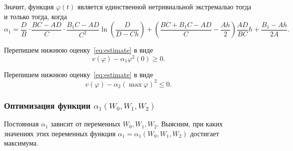 \documentclass[a4paper,14pt]{article}
\begin{document}
Значит, функция $\varphi(t)$ является единственной нетривиальной экстремалью
тогда и только тогда, когда
\begin{equation*}
  \alpha_1
  =
  \frac{D}{B} \cdot
  \frac{B C - A D}{C} \cdot
  \frac{B_1 C - A D}{C^2}
  \ln \left( \frac{D}{D - C h} \right)
  +
  \left( \frac{B C + B_1 C - A D}{C} - \frac{A h }{2} \right)
  \frac{AD}{BC} h
  +
  \frac{B_1 - A h}{2 A}.
\end{equation*}

Перепишем нижнюю оценку~\eqref{eq:estimate} в виде
\begin{equation*}
  v(\varphi) - \alpha_1 \varphi^2(0) \geqslant 0.
\end{equation*}

Перепишем нижнюю оценку~\eqref{eq:estimate} в виде
\begin{equation*}
  v(\varphi) - \alpha_2 (\max \varphi)^2 \leqslant 0.
\end{equation*}

\subsubsection{Оптимизация функции $\alpha_1(W_0, W_1, W_2)$}

Постоянная $\alpha_1$ зависит от переменных $W_0,W_1,W_2$. Выясним, при каких
значениях этих переменных функция $\alpha_1 = \alpha_1(W_0, W_1, W_2)$
достигает максимума.
\end{document}
